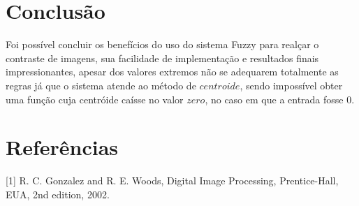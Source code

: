 \documentclass[conference]{IEEEtran}
\begin{document}
\section{Conclus\~ao} 
\label{sec:meth} 

Foi poss\'ivel concluir os benef\'icios do uso do sistema Fuzzy para real\c{c}ar o contraste de imagens, sua facilidade de implementa\c{c}\~ao e resultados finais impressionantes, apesar dos valores extremos n\~ao se adequarem totalmente as regras  j\'a que o sistema atende ao m\'etodo de $centroide$, sendo imposs\'ivel obter uma fun\c{c}\~ao cuja centr\'oide ca\'isse no valor $zero$, no caso em que a entrada fosse $0$.

\section{Refer\^encias} 
\label{sec:meth} 

[1] R. C. Gonzalez and R. E. Woods, Digital Image Processing,
Prentice-Hall, EUA, 2nd edition, 2002.
\end{document}

